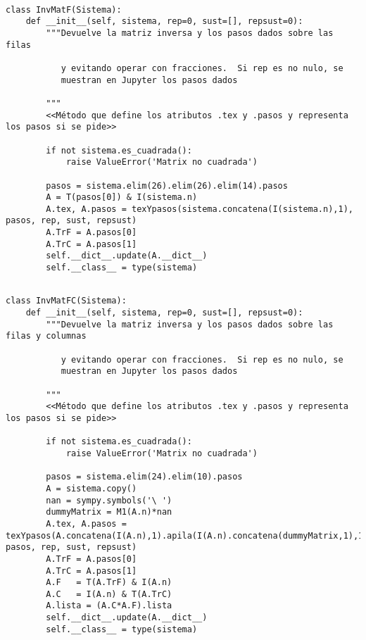 \documentclass[11pt]{report}
\begin{document}
\begin{verbatim}

class InvMatF(Sistema):
    def __init__(self, sistema, rep=0, sust=[], repsust=0):
        """Devuelve la matriz inversa y los pasos dados sobre las filas

           y evitando operar con fracciones.  Si rep es no nulo, se
           muestran en Jupyter los pasos dados

        """
        <<Método que define los atributos .tex y .pasos y representa los pasos si se pide>>

        if not sistema.es_cuadrada():
            raise ValueError('Matrix no cuadrada')
    
        pasos = sistema.elim(26).elim(26).elim(14).pasos
        A = T(pasos[0]) & I(sistema.n)
        A.tex, A.pasos = texYpasos(sistema.concatena(I(sistema.n),1), pasos, rep, sust, repsust)
        A.TrF = A.pasos[0]
        A.TrC = A.pasos[1]
        self.__dict__.update(A.__dict__)
        self.__class__ = type(sistema)

\end{verbatim}


\begin{verbatim}

class InvMatFC(Sistema):
    def __init__(self, sistema, rep=0, sust=[], repsust=0):
        """Devuelve la matriz inversa y los pasos dados sobre las filas y columnas

           y evitando operar con fracciones.  Si rep es no nulo, se
           muestran en Jupyter los pasos dados

        """
        <<Método que define los atributos .tex y .pasos y representa los pasos si se pide>>

        if not sistema.es_cuadrada():
            raise ValueError('Matrix no cuadrada')
    
        pasos = sistema.elim(24).elim(10).pasos
        A = sistema.copy()
        nan = sympy.symbols('\ ')
        dummyMatrix = M1(A.n)*nan
        A.tex, A.pasos = texYpasos(A.concatena(I(A.n),1).apila(I(A.n).concatena(dummyMatrix,1),1), pasos, rep, sust, repsust)
        A.TrF = A.pasos[0]
        A.TrC = A.pasos[1]
        A.F   = T(A.TrF) & I(A.n)
        A.C   = I(A.n) & T(A.TrC)
        A.lista = (A.C*A.F).lista
        self.__dict__.update(A.__dict__)
        self.__class__ = type(sistema)

\end{verbatim}
\end{document}
